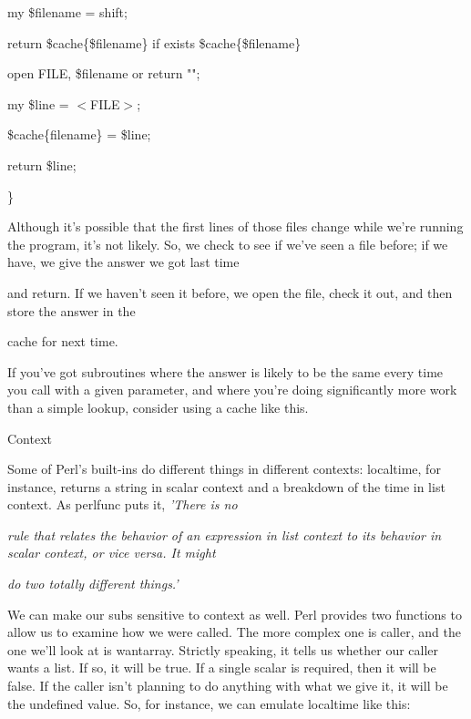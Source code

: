 \documentclass[a4paper,11pt]{book}
\begin{document}
\noindent my \$filename = shift;

\noindent return \$cache\{\$filename\} if exists \$cache\{\$filename\}

\noindent open FILE, \$filename or return "";

\noindent my \$line = $<$FILE$>$;

\noindent \$cache\{filename\} = \$line;

\noindent return \$line;

\noindent \}

\noindent 

\noindent Although it's possible that the first lines of those files change while we're running the program, it's not likely. So, we check to see if we've seen a file before; if we have, we give the answer we got last time

\noindent and return. If we haven't seen it before, we open the file, check it out, and then store the answer in the

\noindent cache for next time.

\noindent 

\noindent If you've got subroutines where the answer is likely to be the same every time you call with a given parameter, and where you're doing significantly more work than a simple lookup, consider using a cache like this.

\noindent 

\noindent Context

\noindent 

\noindent Some of Perl's built-ins do different things in different contexts: localtime, for instance, returns a string in scalar context and a breakdown of the time in list context. As perlfunc puts it, \textit{'There is no}

\noindent \textit{rule that relates the behavior of an expression in list context to its behavior in scalar context, or vice versa. It might}

\noindent \textit{do two totally different things.'}

\noindent 

\noindent We can make our subs sensitive to context as well. Perl provides two functions to allow us to examine how we were called. The more complex one is caller, and the one we'll look at is wantarray. Strictly speaking, it tells us whether our caller wants a list. If so, it will be true. If a single scalar is required, then it will be false. If the caller isn't planning to do anything with what we give it, it will be the undefined value. So, for instance, we can emulate localtime like this:
\end{document}
